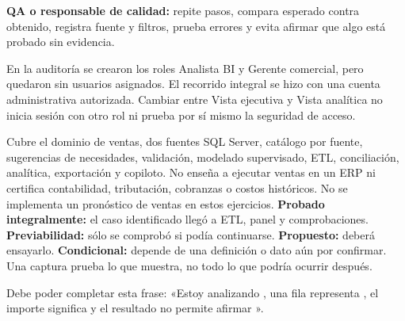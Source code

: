 \textbf{QA o responsable de calidad:} repite pasos, compara esperado contra obtenido, registra fuente y filtros, prueba errores y evita afirmar que algo está probado sin evidencia.
\begin{note}
En la auditoría se crearon los roles Analista BI y Gerente comercial, pero quedaron sin usuarios asignados. El recorrido integral se hizo con una cuenta administrativa autorizada. Cambiar entre Vista ejecutiva y Vista analítica no inicia sesión con otro rol ni prueba por sí mismo la seguridad de acceso.
\end{note}
Cubre el dominio de ventas, dos fuentes SQL Server, catálogo por fuente, sugerencias de necesidades, validación, modelado supervisado, ETL, conciliación, analítica, exportación y copiloto. No enseña a ejecutar ventas en un ERP ni certifica contabilidad, tributación, cobranzas o costos históricos. No se implementa un pronóstico de ventas en estos ejercicios.
\textbf{Probado integralmente:} el caso identificado llegó a ETL, panel y comprobaciones. \textbf{Previabilidad:} sólo se comprobó si podía continuarse. \textbf{Propuesto:} deberá ensayarlo. \textbf{Condicional:} depende de una definición o dato aún por confirmar. Una captura prueba lo que muestra, no todo lo que podría ocurrir después.
\begin{good}
Debe poder completar esta frase: «Estoy analizando \underline{\hspace{18mm}}, una fila representa \underline{\hspace{18mm}}, el importe significa \underline{\hspace{18mm}} y el resultado no permite afirmar \underline{\hspace{18mm}}».
\end{good}

